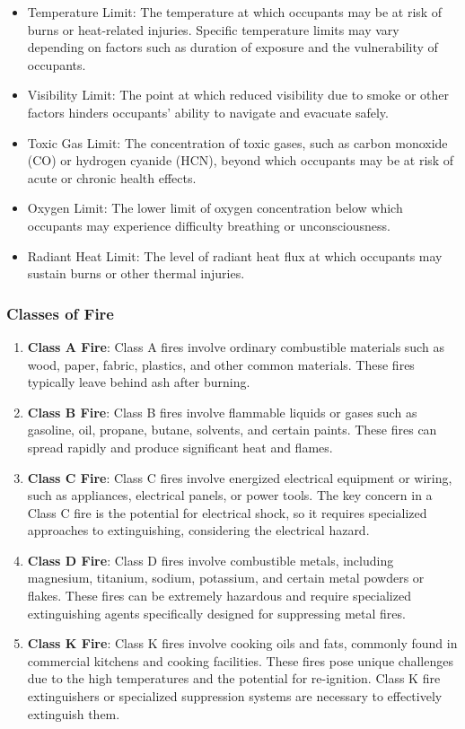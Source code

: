 \documentclass{article}
\begin{document}
\begin{itemize}
  \item Temperature Limit: The temperature at which occupants may be at risk of burns or heat-related injuries. Specific temperature limits may vary depending on factors such as duration of exposure and the vulnerability of occupants.
  \item Visibility Limit: The point at which reduced visibility due to smoke or other factors hinders occupants' ability to navigate and evacuate safely.
  \item Toxic Gas Limit: The concentration of toxic gases, such as carbon monoxide (CO) or hydrogen cyanide (HCN), beyond which occupants may be at risk of acute or chronic health effects.
  \item Oxygen Limit: The lower limit of oxygen concentration below which occupants may experience difficulty breathing or unconsciousness.
  \item Radiant Heat Limit: The level of radiant heat flux at which occupants may sustain burns or other thermal injuries.
\end{itemize}

\subsubsection*{Classes of Fire}
\begin{enumerate}
  \item \textbf{Class A Fire}: Class A fires involve ordinary combustible materials such as wood, paper, fabric, plastics, and other common materials. These fires typically leave behind ash after burning.

  \item \textbf{Class B Fire}: Class B fires involve flammable liquids or gases such as gasoline, oil, propane, butane, solvents, and certain paints. These fires can spread rapidly and produce significant heat and flames.
  
  \item \textbf{Class C Fire}: Class C fires involve energized electrical equipment or wiring, such as appliances, electrical panels, or power tools. The key concern in a Class C fire is the potential for electrical shock, so it requires specialized approaches to extinguishing, considering the electrical hazard.
  
  \item \textbf{Class D Fire}: Class D fires involve combustible metals, including magnesium, titanium, sodium, potassium, and certain metal powders or flakes. These fires can be extremely hazardous and require specialized extinguishing agents specifically designed for suppressing metal fires.
  
  \item \textbf{Class K Fire}: Class K fires involve cooking oils and fats, commonly found in commercial kitchens and cooking facilities. These fires pose unique challenges due to the high temperatures and the potential for re-ignition. Class K fire extinguishers or specialized suppression systems are necessary to effectively extinguish them.
\end{enumerate}
\end{document}
